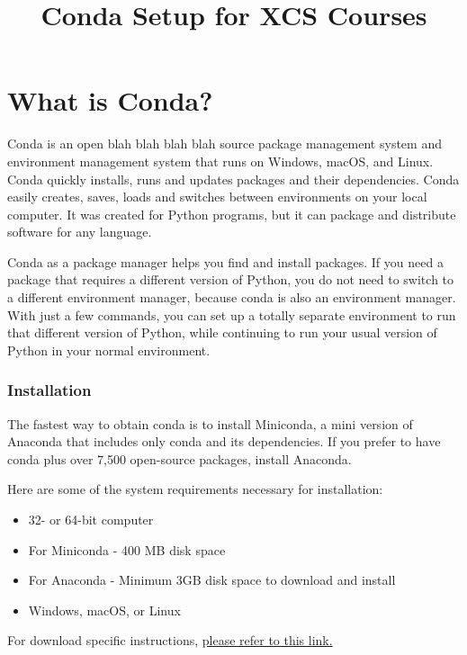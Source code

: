 \documentclass{article}
\begin{document}
\title{Conda Setup for XCS Courses}
\date{}
\maketitle


\part*{What is Conda?}

Conda is an open blah blah blah blah source package management system and environment management system that runs on Windows, macOS, and Linux. Conda quickly installs, runs and updates packages and their dependencies. Conda easily creates, saves, loads and switches between environments on your local computer. It was created for Python programs, but it can package and distribute software for any language.

Conda as a package manager helps you find and install packages. If you need a package that requires a different version of Python, you do not need to switch to a different environment manager, because conda is also an environment manager. With just a few commands, you can set up a totally separate environment to run that different version of Python, while continuing to run your usual version of Python in your normal environment.

\section{Installation}

The fastest way to obtain conda is to install Miniconda, a mini version of Anaconda that includes only conda and its dependencies. If you prefer to have conda plus over 7,500 open-source packages, install Anaconda.

Here are some of the system requirements necessary for installation:
\begin{itemize}
  \item 32- or 64-bit computer
  \item For Miniconda - 400 MB disk space
  \item For Anaconda - Minimum 3GB disk space to download and install
  \item Windows, macOS, or Linux
\end{itemize}

For download specific instructions, \href{https://docs.conda.io/projects/conda/en/latest/user-guide/install/index.html}{please refer to this link.}
\end{document}
